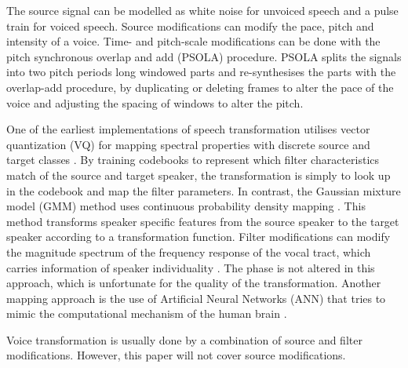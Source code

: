 The source signal can be modelled as white noise for unvoiced speech and a pulse train for voiced speech. Source modifications can modify the pace, pitch and intensity of a voice. Time- and pitch-scale modifications can be done with the pitch synchronous overlap and add (PSOLA) procedure. PSOLA splits the signals into two pitch periods long windowed parts and re-synthesises the parts with the overlap-add procedure, by duplicating or deleting frames to alter the pace of the voice and adjusting the spacing of windows to alter the pitch.

One of the earliest implementations of speech transformation utilises vector quantization (VQ) for mapping spectral properties with discrete source and target classes \cite{abe88}. By training codebooks to represent which filter characteristics match of the source and target speaker, the transformation is simply to look up in the codebook and map the filter parameters. In contrast, the Gaussian mixture model (GMM) method uses continuous probability density mapping \cite{stylianou98}. This method transforms speaker specific features from the source speaker to the target speaker according to a transformation function. Filter modifications can modify the magnitude spectrum of the frequency response of the vocal tract, which carries information of speaker individuality \cite{stylianou09,nguyen09}. The phase is not altered in this approach, which is unfortunate for the quality of the transformation. Another mapping approach is the use of Artificial Neural Networks (ANN) that tries to mimic the computational mechanism of the human brain \cite{desai09,young75}. 

Voice transformation is usually done by a combination of source and filter modifications. However, this paper will not cover source modifications.
